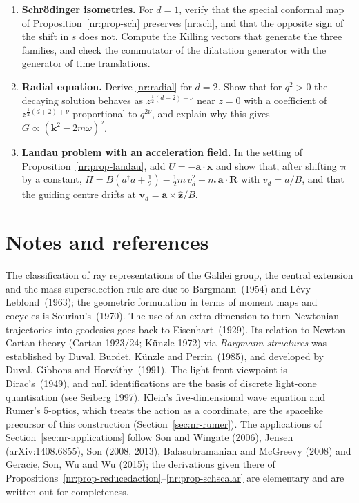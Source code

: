 \begin{enumerate}
\item \textbf{Schr\"odinger isometries.} For $d=1$, verify that the special conformal map
of Proposition~\ref{nr:prop-sch} preserves \eqref{nr:sch}, and that the opposite sign
of the shift in $s$ does not. Compute the Killing vectors that generate the
three families, and check the commutator of the dilatation generator with the
generator of time translations.

\item \textbf{Radial equation.} Derive \eqref{nr:radial} for $d=2$. Show that for
$q^2>0$ the decaying solution behaves as $z^{\frac12(d+2)-\nu}$ near $z=0$ with
a coefficient of $z^{\frac12(d+2)+\nu}$ proportional to $q^{2\nu}$, and explain why this
gives $G\propto(\mathbf{k}^2-2m\omega)^\nu$.

\item \textbf{Landau problem with an acceleration field.} In the setting of
Proposition~\ref{nr:prop-landau}, add $U=-\mathbf{a}\cdot\mathbf{x}$ and show that, after
shifting $\boldsymbol\pi$ by a constant,
$H=B(a^\dagger a+\tfrac12)-\tfrac12m\,v_d^2-m\,\mathbf{a}\cdot\mathbf{R}$ with $v_d=a/B$, and
that the guiding centre drifts at $\mathbf{v}_d=\mathbf{a}\times\hat{\mathbf z}/B$.
\end{enumerate}

\section*{Notes and references}

The classification of ray representations of the Galilei group, the
central extension and the mass superselection rule are due to
Bargmann~(1954) and L\'evy-Leblond~(1963); the geometric formulation in terms of
moment maps and cocycles is Souriau's~(1970). The use of an extra dimension to
turn Newtonian trajectories into geodesics goes back to Eisenhart~(1929). Its
relation to Newton--Cartan theory (Cartan 1923/24; K\"unzle 1972) via
\emph{Bargmann structures} was established by Duval, Burdet, K\"unzle and
Perrin~(1985), and developed by Duval, Gibbons and Horv\'athy~(1991). The
light-front viewpoint is Dirac's~(1949), and null identifications are the basis
of discrete light-cone quantisation (see Seiberg 1997). Klein's five-dimensional wave equation and Rumer's
5-optics, which treats the action as a coordinate, are the spacelike precursor of
this construction (Section~\ref{sec:nr-rumer}). The applications of
Section~\ref{sec:nr-applications} follow Son and Wingate (2006), Jensen (arXiv:1408.6855),
Son (2008, 2013), Balasubramanian and McGreevy (2008) and Geracie, Son, Wu and Wu
(2015); the derivations given there of Propositions~\ref{nr:prop-reducedaction}--\ref{nr:prop-schscalar}
are elementary and are written out for completeness.

